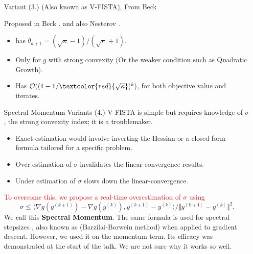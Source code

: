 \documentclass[11pt]{beamer}
\theoremstyle{definition}
\begin{document}
    \begin{frame}{Variant (3.) (Also known as V-FISTA), From Beck}
        \begin{algorithm}[H]
            \begin{tiny}
                \begin{algorithmic}[1]
                    \ENDFOR
                \end{algorithmic}
                \caption{Generic FISTA}    
            \end{tiny}
        \end{algorithm}
        Proposed in Beck \cite{beck_first-order_nodate}, and also Nesterov \cite{nesterov_lecture_2018}. 
        \begin{itemize}
            \item has $\theta_{k + 1} = (\sqrt{\kappa} - 1)/(\sqrt{\kappa} + 1)$. 
            \item Only for $g$ with strong convexity (Or the weaker condition such as Quadratic Growth). 
            \item Has $\mathcal O((1 - 1/\textcolor{red}{\sqrt{\kappa}})^k)$, for both objective value and iterates. 
        \end{itemize}
    \end{frame}

    \begin{frame}{Spectral Momentum Variants (4.)}
        V-FISTA is simple but requires knowledge of $\sigma$, the strong convexity index; it is a troublemaker. 
        \begin{itemize}
            \item Exact estimation would involve inverting the Hessian or a closed-form formula tailored for a specific problem. 
            \item Over estimation of $\sigma$ invalidates the linear convergence results. 
            \item Under estimation of $\sigma$ slows down the linear-convergence. 
        \end{itemize}
        \textcolor{red}{To overcome this, we propose a real-time overestimation of $\sigma$ using}
        \[
            \sigma \le \langle \nabla g(y^{(k + 1)}) - \nabla g(y^{(k)}), y^{(k + 1)} - y^{(k)}\rangle/ 
                    \Vert y^{(k + 1)} - y^{(k)}\Vert^2. 
        \]
        We call this \textbf{Spectral Momentum}. 
        The same formula is used for spectral stepsizes \cite[4.1]{goldstein_field_2016}, also known as (Barzilai-Borwein method) when applied to gradient descent. 
        However, we used it on the momentum term. 
        Its efficacy was demonstrated at the start of the talk. 
        We are not sure why it works so well. 
    \end{frame}
\end{document}

